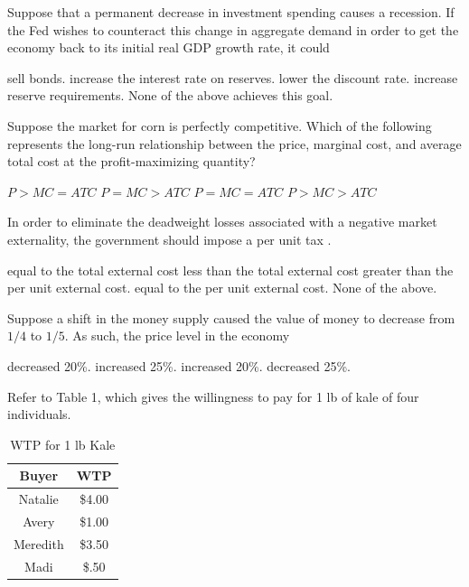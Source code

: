 \documentclass[addpoints,11pt]{exam}
\theoremstyle{definition}
\newcommand{\blank}[0]{\underline{\hspace{3cm}}}
\begin{document}
\begin{questions}
	
	\question Suppose that a permanent decrease in investment spending causes a recession. If the Fed wishes to counteract this change in aggregate demand in order to get the economy back to its initial real GDP growth rate, it could
	
	\begin{choices}
		\choice sell bonds.
		\choice increase the interest rate on reserves.
		\CorrectChoice lower the discount rate. 
		\choice increase reserve requirements.
		\choice None of the above achieves this goal.
	\end{choices}
	
	
	\question Suppose the market for corn is perfectly competitive. Which of the following represents the long-run relationship between the price, marginal cost, and average total cost at the profit-maximizing quantity?
	
	\begin{choices}
		\choice $P > MC = ATC$
		\choice $P = MC > ATC$ 
		\CorrectChoice $P = MC = ATC$
		\choice $P > MC > ATC$
	\end{choices}
	
\newpage
	
	\question In order to eliminate the deadweight losses associated with a negative market externality, the government should impose a per unit tax \blank.
	
	\begin{choices}
		\choice equal to the total external cost
		\choice less than the total external cost
		\choice greater than the per unit external cost.
		\CorrectChoice equal to the per unit external cost.
		\choice None of the above.
	\end{choices}
	
	\question Suppose a shift in the money supply caused the value of money to decrease from $1/4$ to $1/5$. As such, the price level in the economy
	
	\begin{choices}
		\choice decreased 20\%.
		\CorrectChoice increased 25\%.
		\choice increased 20\%.
		\choice decreased 25\%.
	\end{choices}
	
	\question Refer to Table 1, which gives the willingness to pay for 1 lb of kale of four individuals.
	
	\begin{table}[H]
		\caption{WTP for 1 lb Kale}
		\centering
		\begin{tabular}{ c| c}        
			
			\hspace{1cm} Buyer \hspace{1cm}   & \hspace{1cm} WTP \hspace{1cm} \\
			\hline
			Natalie & \$4.00 \\
			Avery & \$1.00 \\
			Meredith & \$3.50 \\
			Madi & \$.50 \\
		\end{tabular}
		

\end{table}
\end{questions}
\end{document}
